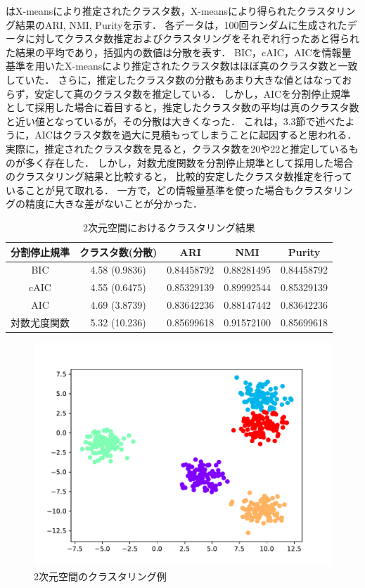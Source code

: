 はX-meansにより推定されたクラスタ数，X-meansにより得られたクラスタリング結果のARI, NMI, Purityを示す．
各データは，100回ランダムに生成されたデータに対してクラスタ数推定およびクラスタリングをそれぞれ行ったあと得られた結果の平均であり，括弧内の数値は分散を表す．
BIC，cAIC，AICを情報量基準を用いたX-meansにより推定されたクラスタ数はほぼ真のクラスタ数と一致していた．
さらに，推定したクラスタ数の分散もあまり大きな値とはなっておらず，安定して真のクラスタ数を推定している．
しかし，AICを分割停止規準として採用した場合に着目すると，推定したクラスタ数の平均は真のクラスタ数と近い値となっているが，その分散は大きくなった．
これは，3.3節で述べたように，AICはクラスタ数を過大に見積もってしまうことに起因すると思われる．
実際に，推定されたクラスタ数を見ると，クラスタ数を20や22と推定しているものが多く存在した．
しかし，対数尤度関数を分割停止規準として採用した場合のクラスタリング結果と比較すると，
比較的安定したクラスタ数推定を行っていることが見て取れる．
一方で，どの情報量基準を使った場合もクラスタリングの精度に大きな差がないことが分かった．

\begin{table}[htb]
  \centering
  \caption{2次元空間におけるクラスタリング結果}
  \label{table:2dim}
  \begin{tabular}{|c|c|c|c|c|} \hline
    分割停止規準 & クラスタ数(分散) & ARI & NMI & Purity \\\hline
    BIC & 4.58 (0.9836) & 0.84458792 & 0.88281495 & 0.84458792\\
    cAIC & 4.55 (0.6475) & 0.85329139 & 0.89992544 & 0.85329139\\
    AIC & 4.69 (3.8739) & 0.83642236 & 0.88147442 & 0.83642236\\
    対数尤度関数 & 5.32 (10.236) & 0.85699618 & 0.91572100 & 0.85699618\\\hline
  \end{tabular}
\end{table}

\begin{figure}[htbp]
  \begin{center}
    \includegraphics[width=0.7\linewidth]{./img/BIC_2.pdf}
      \caption{2次元空間のクラスタリング例}
      \label{fig:2dim}
  \end{center}
\end{figure}


